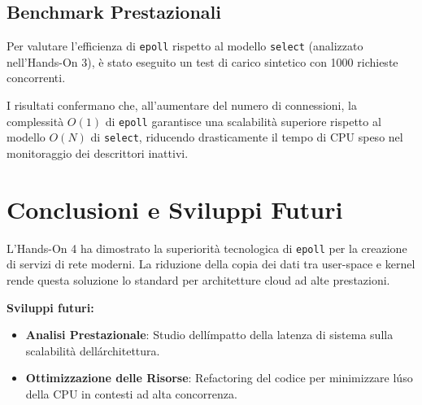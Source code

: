 \documentclass[a4paper,12pt]{article}
\begin{document}
\subsection{Benchmark Prestazionali}
Per valutare l'efficienza di \texttt{epoll} rispetto al modello \texttt{select} (analizzato nell'Hands-On 3), è stato eseguito un test di carico sintetico con 1000 richieste concorrenti.
I risultati confermano che, all'aumentare del numero di connessioni, la complessità $O(1)$ di \texttt{epoll} garantisce una scalabilità superiore rispetto al modello $O(N)$ di \texttt{select}, riducendo drasticamente il tempo di CPU speso nel monitoraggio dei descrittori inattivi.

\section{Conclusioni e Sviluppi Futuri}
L'Hands-On 4 ha dimostrato la superiorità tecnologica di \texttt{epoll} per la creazione di servizi di rete moderni. La riduzione della copia dei dati tra user-space e kernel rende questa soluzione lo standard per architetture cloud ad alte prestazioni.

\noindent \textbf{Sviluppi futuri:}
\begin{itemize}
    \item \textbf{Analisi Prestazionale}: Studio dell\'impatto della latenza di sistema sulla scalabilità dell\'architettura.
    \item \textbf{Ottimizzazione delle Risorse}: Refactoring del codice per minimizzare l\'uso della CPU in contesti ad alta concorrenza.
\end{itemize}
\end{document}
